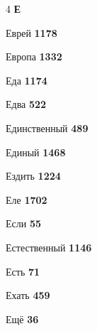 \begin{multicols}{4}
\vspace{0.6em}\noindent\textbf{\normalsize\sffamily\color{primary} Е}\par\vspace{0.2em}
\noindent Еврей \dotfill \textbf{\color{secondary} 1178}\par
\noindent Европа \dotfill \textbf{\color{secondary} 1332}\par
\noindent Еда \dotfill \textbf{\color{secondary} 1174}\par
\noindent Едва \dotfill \textbf{\color{secondary} 522}\par
\noindent Единственный \dotfill \textbf{\color{secondary} 489}\par
\noindent Единый \dotfill \textbf{\color{secondary} 1468}\par
\noindent Ездить \dotfill \textbf{\color{secondary} 1224}\par
\noindent Еле \dotfill \textbf{\color{secondary} 1702}\par
\noindent Если \dotfill \textbf{\color{secondary} 55}\par
\noindent Естественный \dotfill \textbf{\color{secondary} 1146}\par
\noindent Есть \dotfill \textbf{\color{secondary} 71}\par
\noindent Ехать \dotfill \textbf{\color{secondary} 459}\par
\noindent Ещё \dotfill \textbf{\color{secondary} 36}\par


\end{multicols}
